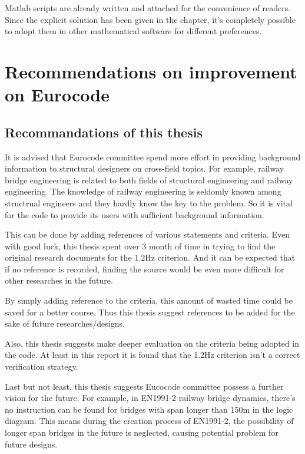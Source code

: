 Matlab scripts are already written and attached for the convenience of readers. Since the explicit solution has been given in the chapter, it's completely possible to adopt them in other mathematical software for different preferences.


\chapter{Recommendations on improvement on Eurocode}


\section{Recommandations of this thesis}

It is advised that Eurocode committee spend more effort in providing background information to structural designers on cross-field topics. For example, railway bridge engineering is related to both fields of structural engineering and railway engineering. The knowledge of railway engineering is seldomly known among structrual engineers and they hardly know the key to the problem. So it is vital for the code to provide its users with sufficient background information.

This can be done by adding references of various statements and criteria. Even with good luck, this thesis spent over 3 month of time in trying to find the original research documents for the 1.2Hz criterion. And it can be expected that if no reference is recorded, finding the source would be even more difficult for other researches in the future.

By simply adding reference to the criteria, this amount of wasted time could be saved for a better course. Thus this thesis suggest references to be added for the sake of future researches/designs.

Also, this thesis suggests make deeper evaluation on the criteria being adopted in the code. At least in this report it is found that the 1.2Hz criterion isn't a correct verification strategy. 

Last but not least, this thesis suggests Eucocode committee possess a further vision for the future. For example, in EN1991-2 railway bridge dynamics, there's no instruction can be found for bridges with span longer than 150m in the logic diagram. This means during the creation process of EN1991-2, the possibility of longer span bridges in the future is neglected, causing potential problem for future designs. 


